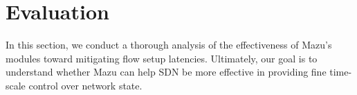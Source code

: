 \section{Evaluation}
\label{s:evaluation}

In this section, we conduct a thorough analysis of the effectiveness of Mazu's modules toward mitigating flow setup latencies. Ultimately, our goal is to understand whether Mazu can help SDN be more effective in providing fine time-scale control over network state.



